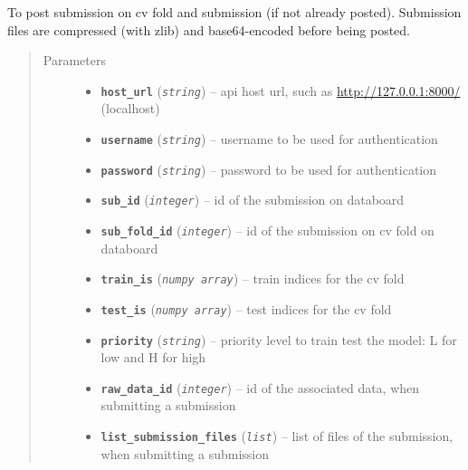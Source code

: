 \documentclass[letterpaper,10pt,english]{sphinxmanual}
\begin{document}
\begin{fulllineitems}
\label{modules/views:test_files.post_api.post_submission_fold}
To post submission on cv fold and submission (if not already posted).    Submission files are compressed (with zlib) and base64-encoded before being    posted.
\begin{quote}\begin{description}
\item[{Parameters}] \leavevmode\begin{itemize}
\item {} 
\textbf{\texttt{host\_url}} (\emph{\texttt{string}}) -- api host url, such as \url{http://127.0.0.1:8000/} (localhost)

\item {} 
\textbf{\texttt{username}} (\emph{\texttt{string}}) -- username to be used for authentication

\item {} 
\textbf{\texttt{password}} (\emph{\texttt{string}}) -- password to be used for authentication

\item {} 
\textbf{\texttt{sub\_id}} (\emph{\texttt{integer}}) -- id of the submission on databoard

\item {} 
\textbf{\texttt{sub\_fold\_id}} (\emph{\texttt{integer}}) -- id of the submission on cv fold on databoard

\item {} 
\textbf{\texttt{train\_is}} (\emph{\texttt{numpy array}}) -- train indices for the cv fold

\item {} 
\textbf{\texttt{test\_is}} (\emph{\texttt{numpy array}}) -- test indices for the cv fold

\item {} 
\textbf{\texttt{priority}} (\emph{\texttt{string}}) -- priority level to train test the model: L for low    and H for high

\item {} 
\textbf{\texttt{raw\_data\_id}} (\emph{\texttt{integer}}) -- id of the associated data, when submitting a submission

\item {} 
\textbf{\texttt{list\_submission\_files}} (\emph{\texttt{list}}) -- list of files of the submission,        when submitting a submission


\end{itemize}
\end{description}
\end{quote}
\end{fulllineitems}
\end{document}
